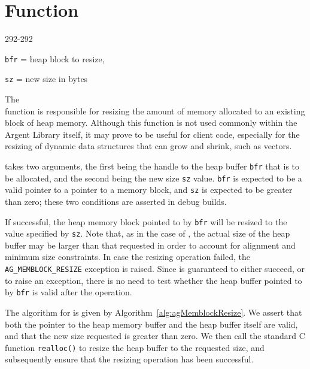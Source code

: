 %
%
\section{Function \agMemblockResize}
\label{sec:agMemblockResize}

  {292-292}{\texttt{bfr} = heap block to resize,\par\texttt{sz} = new size in
  bytes}

The \agMemblockResize{} \\ function is responsible for resizing the amount of 
memory allocated to an existing block of heap memory. Although this function is 
not used commonly within the Argent Library itself, it may prove to be useful 
for client code, especially for the resizing of dynamic data structures that can
grow and shrink, such as vectors.

\agMemblockResize{} takes two arguments, the first being the handle to the heap
buffer \texttt{bfr} that is to be allocated, and the second being the new size 
\texttt{sz} value. \texttt{bfr} is expected to be a valid pointer to a pointer 
to a memory block, and \texttt{sz} is expected to be greater than zero; these 
two conditions are asserted in debug builds.


If successful, the heap memory block pointed to by \texttt{bfr} will be resized 
to the value specified by \texttt{sz}. Note that, as in the case of 
\agMemblockNew, the actual size of the heap buffer may be larger than that
requested in order to account for alignment and minimum size constraints. In
case the resizing operation failed, the \texttt{AG\_MEMBLOCK\_RESIZE} exception 
is raised. Since \agMemblockResize{} is guaranteed to either succeed, or to raise
an exception, there is no need to test whether the heap buffer pointed to by 
\texttt{bfr} is valid after the operation.

The algorithm for \agMemblockResize{} is given by Algorithm\ 
\ref{alg:agMemblockResize}. We assert that both the pointer to the heap memory 
buffer and the heap buffer itself are valid, and that the new size requested is 
greater than zero. We then call the standard C function \texttt{realloc()} to 
resize the heap buffer to the requested size, and subsequently ensure that the 
resizing operation has been successful.

